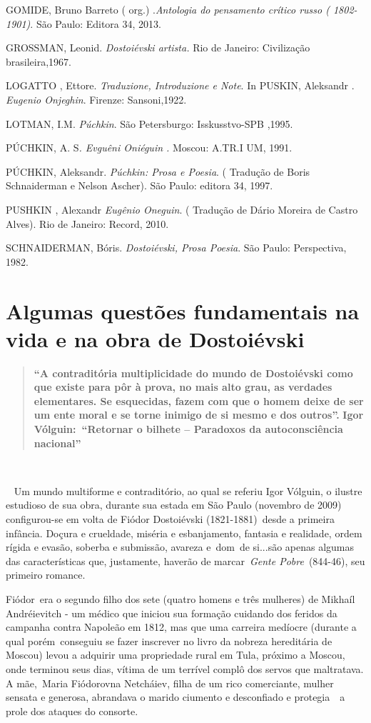 GOMIDE, Bruno Barreto ( org.) .\emph{Antologia do pensamento crítico
russo ( 1802-1901)}. São Paulo: Editora 34, 2013.

GROSSMAN, Leonid. \emph{Dostoiévski artista.} Rio de Janeiro:
Civilização brasileira,1967.

LOGATTO , Ettore. \emph{Traduzione, Introduzione e Note}. In PUSKIN,
Aleksandr . \emph{Eugenio Onjeghin}. Firenze: Sansoni,1922.

LOTMAN, I.M. \emph{Púchkin}. São Petersburgo: Isskusstvo-SPB ,1995.

PÚCHKIN, A. S\emph{. Evguêni Oniéguin .} Moscou: A.TR.I UM, 1991.

PÚCHKIN, Aleksandr. \emph{Púchkin: Prosa e Poesia}. ( Tradução de Boris
Schnaiderman e Nelson Ascher). São Paulo: editora 34, 1997.

PUSHKIN , Alexandr \emph{Eugênio Oneguin}. ( Tradução de Dário Moreira
de Castro Alves). Rio de Janeiro: Record, 2010.

SCHNAIDERMAN, Bóris. \emph{Dostoiévski, Prosa Poesia}. São Paulo:
Perspectiva, 1982.

\chapter{Algumas questões fundamentais na vida e na obra de Dostoiévski}

\begin{quote}
\textbf{``A contraditória multiplicidade do mundo de Dostoiévski como
que existe para pôr à prova, no mais alto grau, as verdades elementares.
Se esquecidas, fazem com que o homem deixe de ser um ente moral e se
torne inimigo de si mesmo e dos outros''.} \textbf{Igor
Vólguin:~``Retornar o bilhete -- Paradoxos da autoconsciência
nacional''~}
\end{quote}

\textbf{~}

~ Um mundo multiforme e contraditório, ao qual se referiu Igor Vólguin,
o ilustre estudioso de sua obra, durante sua estada em São Paulo
(novembro de 2009) configurou-se em volta de Fiódor Dostoiévski
(1821-1881)~desde a primeira infância. Doçura e crueldade, miséria e
esbanjamento, fantasia e realidade, ordem rígida e evasão, soberba e
submissão, avareza e~dom~de si...são apenas algumas das características
que, justamente, haverão de marcar~\emph{Gente Pobre}~(844-46), seu
primeiro romance.

Fiódor~era o segundo filho dos sete (quatro homens e três mulheres) de
Mikhaíl Andréievitch - um médico que iniciou sua formação cuidando dos
feridos da campanha contra Napoleão em 1812, mas que uma carreira
medíocre (durante a qual porém~conseguiu se fazer inscrever no livro da
nobreza hereditária de Moscou) levou a adquirir uma propriedade rural em
Tula, próximo a Moscou, onde terminou seus dias, vítima de um terrível
complô dos servos que maltratava. A mãe,~Maria Fiódorovna Netcháiev,
filha de um rico comerciante, mulher sensata e generosa, abrandava o
marido ciumento e desconfiado e protegia~~a prole dos ataques do
consorte.

